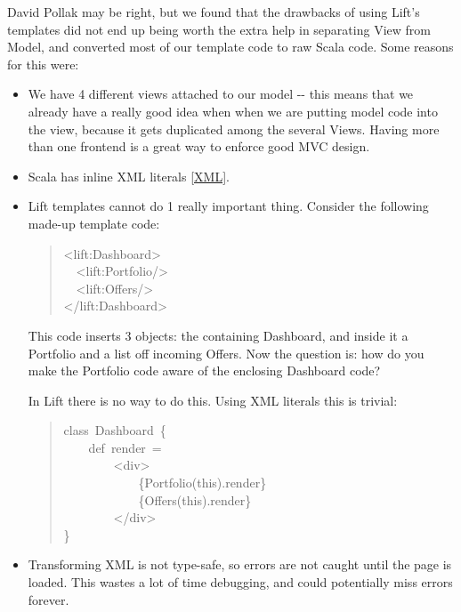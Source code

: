 \documentclass[a4]{article}
\begin{document}
David Pollak may be right, but we found that the drawbacks of using Lift's
templates did not end up being worth the extra help in separating View from
Model, and converted most of our template code to raw Scala code. Some reasons
for this were:
%
\begin{itemize}

\item We have 4 different views attached to our model -{}- this means that we already
have a really good idea when when we are putting model code into the view,
because it gets duplicated among the several Views. Having more than one
frontend is a great way to enforce good MVC design.

\item Scala has inline XML literals \hyperlink{xml}{[XML]}.

\item Lift templates cannot do 1 really important thing. Consider the following
made-up template code:
%
\begin{quote}{\ttfamily \raggedright \noindent
<lift:Dashboard>\\
~~<lift:Portfolio/>\\
~~<lift:Offers/>\\
</lift:Dashboard>
}
\end{quote}

This code inserts 3 objects: the containing Dashboard, and inside it a
Portfolio and a list off incoming Offers. Now the question is: how do you
make the Portfolio code aware of the enclosing Dashboard code?

In Lift there is no way to do this. Using XML literals this is trivial:
%
\begin{quote}{\ttfamily \raggedright \noindent
class~Dashboard~\{\\
~~~~def~render~=\\
~~~~~~~~<div>\\
~~~~~~~~~~~~\{Portfolio(this).render\}\\
~~~~~~~~~~~~\{Offers(this).render\}\\
~~~~~~~~</div>\\
\}
}
\end{quote}

\item Transforming XML is not type-safe, so errors are not caught until the page is
loaded. This wastes a lot of time debugging, and could potentially miss
errors forever.

\end{itemize}
\end{document}
